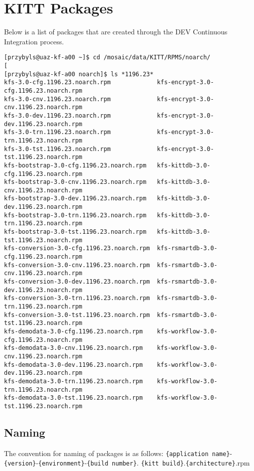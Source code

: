 \documentclass[12pt,notitlepage]{article}
\begin{document}
\section{KITT Packages}
Below is a list of packages that are created through the DEV Continuous Integration process.

\lstset{basicstyle=\tiny,
  breaklines=true,
  includerangemarker=false}

\begin{lstlisting}
[przybyls@uaz-kf-a00 ~]$ cd /mosaic/data/KITT/RPMS/noarch/
[
[przybyls@uaz-kf-a00 noarch]$ ls *1196.23*
kfs-3.0-cfg.1196.23.noarch.rpm             kfs-encrypt-3.0-cfg.1196.23.noarch.rpm
kfs-3.0-cnv.1196.23.noarch.rpm             kfs-encrypt-3.0-cnv.1196.23.noarch.rpm
kfs-3.0-dev.1196.23.noarch.rpm             kfs-encrypt-3.0-dev.1196.23.noarch.rpm
kfs-3.0-trn.1196.23.noarch.rpm             kfs-encrypt-3.0-trn.1196.23.noarch.rpm
kfs-3.0-tst.1196.23.noarch.rpm             kfs-encrypt-3.0-tst.1196.23.noarch.rpm
kfs-bootstrap-3.0-cfg.1196.23.noarch.rpm   kfs-kittdb-3.0-cfg.1196.23.noarch.rpm
kfs-bootstrap-3.0-cnv.1196.23.noarch.rpm   kfs-kittdb-3.0-cnv.1196.23.noarch.rpm
kfs-bootstrap-3.0-dev.1196.23.noarch.rpm   kfs-kittdb-3.0-dev.1196.23.noarch.rpm
kfs-bootstrap-3.0-trn.1196.23.noarch.rpm   kfs-kittdb-3.0-trn.1196.23.noarch.rpm
kfs-bootstrap-3.0-tst.1196.23.noarch.rpm   kfs-kittdb-3.0-tst.1196.23.noarch.rpm
kfs-conversion-3.0-cfg.1196.23.noarch.rpm  kfs-rsmartdb-3.0-cfg.1196.23.noarch.rpm
kfs-conversion-3.0-cnv.1196.23.noarch.rpm  kfs-rsmartdb-3.0-cnv.1196.23.noarch.rpm
kfs-conversion-3.0-dev.1196.23.noarch.rpm  kfs-rsmartdb-3.0-dev.1196.23.noarch.rpm
kfs-conversion-3.0-trn.1196.23.noarch.rpm  kfs-rsmartdb-3.0-trn.1196.23.noarch.rpm
kfs-conversion-3.0-tst.1196.23.noarch.rpm  kfs-rsmartdb-3.0-tst.1196.23.noarch.rpm
kfs-demodata-3.0-cfg.1196.23.noarch.rpm    kfs-workflow-3.0-cfg.1196.23.noarch.rpm
kfs-demodata-3.0-cnv.1196.23.noarch.rpm    kfs-workflow-3.0-cnv.1196.23.noarch.rpm
kfs-demodata-3.0-dev.1196.23.noarch.rpm    kfs-workflow-3.0-dev.1196.23.noarch.rpm
kfs-demodata-3.0-trn.1196.23.noarch.rpm    kfs-workflow-3.0-trn.1196.23.noarch.rpm
kfs-demodata-3.0-tst.1196.23.noarch.rpm    kfs-workflow-3.0-tst.1196.23.noarch.rpm
\end{lstlisting}

\lstset{basicstyle=\small,
  breaklines=true,
  includerangemarker=false}

\subsection{Naming}
The convention for naming of packages is as follows:
\verb|{application name}|-\verb|{version}|-\verb|{environment}|-\verb|{build number}|.
\verb|{kitt build}|.\verb|{architecture}|.rpm
\end{document}
